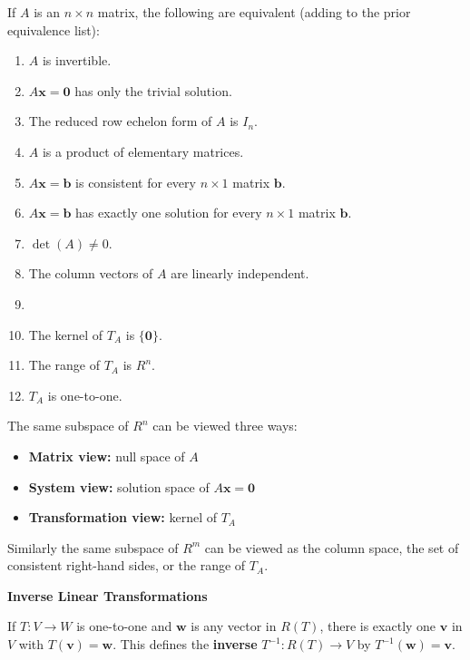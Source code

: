 \documentclass{article}
\newcommand{\redheading}[1]{{\vspace{2mm}\noindent\Large\bfseries\color{red!55!black} #1\par}\vspace{2mm}}
\begin{document}
\begin{tcolorbox}[colback=red!4, colframe=red!60!black,
  title={\textbf{Theorem 8.2.4 --- Equivalent Statements}}, boxrule=0.5mm, arc=3mm]
If $A$ is an $n\times n$ matrix, the following are equivalent (adding to the prior
equivalence list):
\begin{enumerate}
  \item[(a)] $A$ is invertible.
  \item[(b)] $A\mathbf{x} = \mathbf{0}$ has only the trivial solution.
  \item[(c)] The reduced row echelon form of $A$ is $I_n$.
  \item[(d)] $A$ is a product of elementary matrices.
  \item[(e)] $A\mathbf{x} = \mathbf{b}$ is consistent for every $n\times 1$ matrix $\mathbf{b}$.
  \item[(f)] $A\mathbf{x} = \mathbf{b}$ has exactly one solution for every $n\times 1$ matrix $\mathbf{b}$.
  \item[(g)] $\det(A) \neq 0$.
  \item[(h)] The column vectors of $A$ are linearly independent.
  \item[\ldots]
  \item[(t)] The kernel of $T_A$ is $\{\mathbf{0}\}$.
  \item[(u)] The range of $T_A$ is $R^n$.
  \item[(v)] $T_A$ is one-to-one.
\end{enumerate}
\end{tcolorbox}

The same subspace of $R^n$ can be viewed three ways:
\begin{itemize}
  \item \textbf{Matrix view:} null space of $A$
  \item \textbf{System view:} solution space of $A\mathbf{x}=\mathbf{0}$
  \item \textbf{Transformation view:} kernel of $T_A$
\end{itemize}
Similarly the same subspace of $R^m$ can be viewed as the column space, the set of consistent
right-hand sides, or the range of $T_A$.

\vspace{2mm}

\redheading{Inverse Linear Transformations}

If $T : V \to W$ is one-to-one and $\mathbf{w}$ is any vector in $R(T)$, there is exactly
one $\mathbf{v}$ in $V$ with $T(\mathbf{v}) = \mathbf{w}$. This defines the \textbf{inverse}
$T^{-1} : R(T) \to V$ by $T^{-1}(\mathbf{w}) = \mathbf{v}$.
\end{document}
